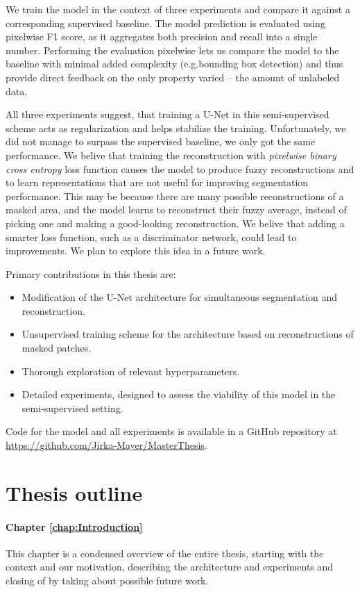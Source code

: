 We train the model in the context of three experiments and compare it against a corresponding supervised baseline. The model prediction is evaluated using pixelwise F1 score, as it aggregates both precision and recall into a single number. Performing the evaluation pixelwise lets us compare the model to the baseline with minimal added complexity (e.g.\@ bounding box detection) and thus provide direct feedback on the only property varied -- the amount of unlabeled data.

All three experiments suggest, that training a U-Net in this semi-supervised scheme acts as regularization and helps stabilize the training. Unfortunately, we did not manage to surpass the supervised baseline, we only got the same performance. We belive that training the reconstruction with \emph{pixelwise binary cross entropy} loss function causes the model to produce fuzzy reconstructions and to learn representations that are not useful for improving segmentation performance. This may be because there are many possible reconstructions of a masked area, and the model learns to reconstruct their fuzzy average, instead of picking one and making a good-looking reconstruction. We belive that adding a smarter loss function, such as a discriminator network, could lead to improvements. We plan to explore this idea in a future work.

Primary contributions in this thesis are:

\begin{itemize}
    \item Modification of the U-Net architecture for simultaneous segmentation and reconstruction.
    \item Unsupervised training scheme for the architecture based on reconstructions of masked patches.
    \item Thorough exploration of relevant hyperparameters.
    \item Detailed experiments, designed to assess the viability of this model in the semi-supervised setting.
\end{itemize}

Code for the model and all experiments is available in a GitHub repository at \url{https://github.com/Jirka-Mayer/MasterThesis}.


\section{Thesis outline}

\paragraph*{Chapter \ref{chap:Introduction}} This chapter is a condensed overview of the entire thesis, starting with the context and our motivation, describing the architecture and experiments and closing of by taking about possible future work.

